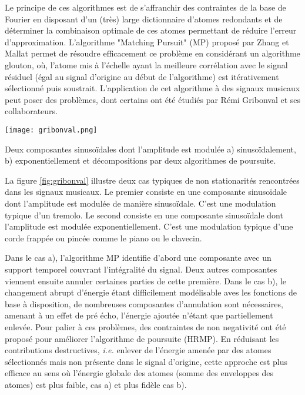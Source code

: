 Le principe de ces algorithmes est de s'affranchir des contraintes de la base de Fourier en disposant d'un (très) large dictionnaire d'atomes redondants et de déterminer la combinaison optimale de ces atomes permettant de réduire l'erreur d'approximation. L'algorithme "Matching Pursuit" (MP) proposé par Zhang et Mallat\cite{mallat1993matching} permet de résoudre efficacement ce problème en considérant un algorithme glouton, où, l'atome mis à l'échelle ayant la meilleure corrélation avec le signal résiduel (égal au signal d'origine au début de l'algorithme) est itérativement sélectionné puis soustrait. L'application de cet algorithme à des signaux musicaux peut poser des problèmes, dont certains ont été étudiés par Rémi Gribonval et ses collaborateurs\cite{gribonval1996sound}. %

\begin{marginfigure}
  \texttt{[image: gribonval.png]}
  \caption{Deux composantes sinusoïdales dont l'amplitude est modulée a) sinusoïdalement, b) exponentiellement et décompositions par deux algorithmes de poursuite.}
  \label{fig:gribonval}
\end{marginfigure}

La figure \ref{fig:gribonval} illustre deux cas typiques de non stationarités rencontrées dans les signaux musicaux. Le premier consiste en une composante sinusoïdale dont l'amplitude est modulée de manière sinusoïdale. C'est une modulation typique d'un tremolo. Le second consiste en une composante sinusoïdale dont l'amplitude est modulée exponentiellement. C'est une modulation typique d'une corde frappée ou pincée comme le piano ou le clavecin.

Dans le cas a), l'algorithme MP identifie d'abord une composante avec un support temporel couvrant l'intégralité du signal. Deux autres composantes viennent ensuite annuler certaines parties de cette première. Dans le cas b), le changement abrupt d'énergie étant difficilement modélisable aves les fonctions de base à disposition, de nombreuses composantes d'annulation sont nécessaires, amenant à un effet de pré écho, l'énergie ajoutée n'étant que partiellement enlevée. Pour palier à ces problèmes, des contraintes de non negativité ont été proposé pour améliorer l'algorithme de poursuite (HRMP). En réduisant les contributions destructives, \textit{i.e.} enlever de l'énergie amenée par des atomes sélectionnés mais non présente dans le signal d'origine, cette approche est plus efficace au sens où l'énergie globale des atomes (somme des enveloppes des atomes) est plus faible, cas a) et plus fidèle cas b).

